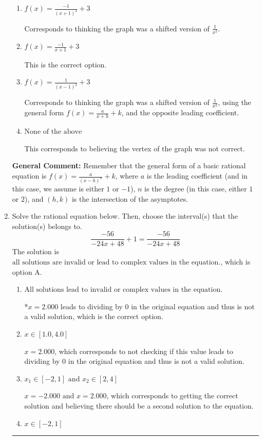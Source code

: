 \documentclass{extbook}[14pt]
\newcommand{\litem}[1]{\item #1

\rule{\textwidth}{0.4pt}}
\begin{document}
\begin{enumerate}
{\begin{enumerate}[label=\Alph*.]
Corresponds to using the general form $f(x) = \frac{a}{x+h}+k$ and the opposite leading coefficient.
\item \( f(x) = \frac{-1}{(x + 1)^2} + 3 \)

Corresponds to thinking the graph was a shifted version of $\frac{1}{x^2}$.
\item \( f(x) = \frac{-1}{x + 1} + 3 \)

This is the correct option.
\item \( f(x) = \frac{1}{(x - 1)^2} + 3 \)

Corresponds to thinking the graph was a shifted version of $\frac{1}{x^2}$, using the general form $f(x) = \frac{a}{x+h}+k$, and the opposite leading coefficient.
\item \( \text{None of the above} \)

This corresponds to believing the vertex of the graph was not correct.
\end{enumerate}

\textbf{General Comment:} Remember that the general form of a basic rational equation is $ f(x) = \frac{a}{(x-h)^n} + k$, where $a$ is the leading coefficient (and in this case, we assume is either $1$ or $-1$), $n$ is the degree (in this case, either $1$ or $2$), and $(h, k)$ is the intersection of the asymptotes.
}
\litem{
Solve the rational equation below. Then, choose the interval(s) that the solution(s) belongs to.
\[ \frac{-56}{-24x + 48} + 1 = \frac{-56}{-24x + 48} \]The solution is \( \text{all solutions are invalid or lead to complex values in the equation.} \), which is option A.\begin{enumerate}[label=\Alph*.]
\item \( \text{All solutions lead to invalid or complex values in the equation.} \)

*$x = 2.000$ leads to dividing by 0 in the original equation and thus is not a valid solution, which is the correct option.
\item \( x \in [1.0,4.0] \)

$x = 2.000$, which corresponds to not checking if this value leads to dividing by 0 in the original equation and thus is not a valid solution.
\item \( x_1 \in [-2, 1] \text{ and } x_2 \in [2,4] \)

$x = -2.000 \text{ and } x = 2.000$, which corresponds to getting the correct solution and believing there should be a second solution to the equation.
\item \( x \in [-2,1] \)


\end{enumerate}}
\end{enumerate}
\end{document}
